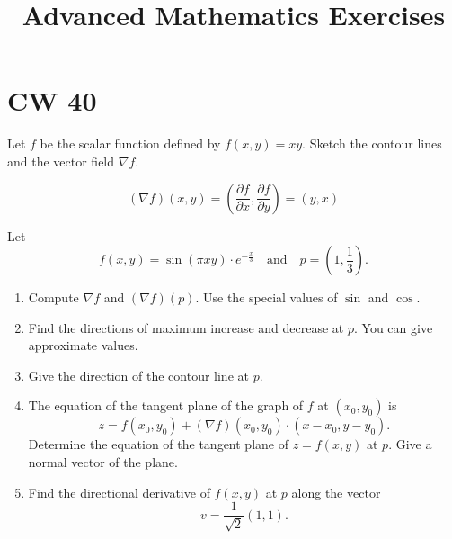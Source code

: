 \documentclass[11pt]{article}
\title{Advanced Mathematics Exercises}
\date{}
\begin{document}
\maketitle

\section{CW 40}

\begin{exercise}
	Let $f$ be the scalar function defined by $f(x,y) = xy$. Sketch the contour lines and the vector field $\nabla f$.
\end{exercise}

\begin{solution}
	$$
		(\nabla f)(x,y) = \left( \frac{\partial f}{\partial x}, \frac{\partial f}{\partial y} \right) = (y,x)
	$$
	\begin{center}
	\end{center}
\end{solution}

\begin{exercise}
	Let
	$$
		f(x,y) = \sin(\pi xy) \cdot e^{-\frac{x}{3}} \quad \text{and} \quad p = \left(1, \frac{1}{3}\right).
	$$
	\begin{enumerate}
		\item Compute $\nabla f$ and $(\nabla f)(p)$. Use the special values of $\sin$ and $\cos$.
		\item Find the directions of maximum increase and decrease at $p$. You can give approximate values.
		\item Give the direction of the contour line at $p$.
		\item The equation of the tangent plane of the graph of $f$ at $(x_0, y_0)$ is
		      $$
			      z = f(x_0, y_0) + (\nabla f)(x_0, y_0) \cdot (x - x_0, y - y_0).
		      $$
		      Determine the equation of the tangent plane of $z = f(x,y)$ at $p$. Give a normal vector of the plane.
		\item Find the directional derivative of $f(x,y)$ at $p$ along the vector
		      $$
			      v = \frac{1}{\sqrt{2}} (1,1).
		      $$
	\end{enumerate}
\end{exercise}
\end{document}
